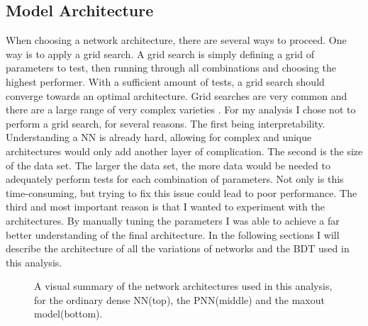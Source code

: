 \subsection{Model Architecture}\label{subsec:arch}
When choosing a network architecture, there are several ways to proceed. One way is to apply a grid search.
A grid search is simply defining a grid of parameters to test, then running through all combinations and 
choosing the highest performer. With a sufficient amount of tests, a grid search should converge towards 
an optimal architecture. Grid searches are very common and there are a large range of very complex varieties \cite{GS}.
For my analysis I chose not to perform a grid search, for several reasons. The first being interpretability.
Understanding a \ac{NN} is already hard, allowing for complex and unique architectures would only add another layer
of complication. The second is the size of the data set. The larger the data set, the more data 
would be needed to adequately perform tests for each combination of parameters. Not only is this time-consuming,
but trying to fix this issue could lead to poor performance. The third and most important reason is that 
I wanted to experiment with the architectures. By manually tuning the parameters I was able to achieve a far 
better understanding of the final architecture. In the following sections I will describe the architecture of all the 
variations of networks and the \ac{BDT} used in this analysis.
\begin{figure}
    \caption{A visual summary of the network architectures used in this analysis, for the ordinary dense \acs{NN}(top), the \acs{PNN}(middle)
    and the maxout model(bottom).}
    \label{fig:arch}
\end{figure}
